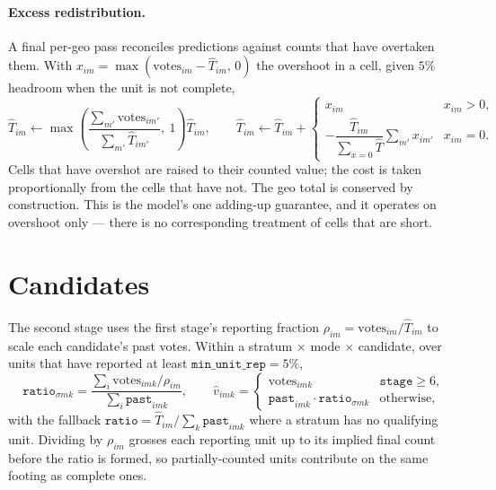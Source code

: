 \documentclass[11pt]{article}
\newcommand{\var}[1]{\texttt{#1}}
\begin{document}
\paragraph{Excess redistribution.} A final per-geo pass reconciles predictions against
counts that have overtaken them. With $x_{im} = \max(\text{votes}_{im} - \widehat{T}_{im},\,0)$
the overshoot in a cell, given $5\%$ headroom when the unit is not complete,
\begin{equation}
  \widehat{T}_{im} \leftarrow \max\!\left(\frac{\sum_{m'} \text{votes}_{im'}}{\sum_{m'} \widehat{T}_{im'}},\ 1\right) \widehat{T}_{im},
  \qquad
  \widehat{T}_{im} \leftarrow \widehat{T}_{im} +
  \begin{cases}
    x_{im} & x_{im} > 0,\\[3pt]
    -\dfrac{\widehat{T}_{im}}{\sum_{x=0} \widehat{T}} \displaystyle\sum_{m'} x_{im'} & x_{im} = 0 .
  \end{cases}
  \label{eq:excess}
\end{equation}
Cells that have overshot are raised to their counted value; the cost is taken
proportionally from the cells that have not. The geo total is conserved by construction.
This is the model's one adding-up guarantee, and it operates on overshoot only --- there
is no corresponding treatment of cells that are short.

\section{Candidates}

The second stage uses the first stage's reporting fraction
$\rho_{im} = \text{votes}_{im} / \widehat{T}_{im}$ to scale each candidate's past votes.
Within a stratum $\times$ mode $\times$ candidate, over units that have reported at least
$\var{min\_unit\_rep} = 5\%$,
\begin{equation}
  \var{ratio}_{\sigma m k} =
  \frac{\sum_{i} \text{votes}_{imk} / \rho_{im}}{\sum_{i} \var{past}_{imk}},
  \qquad
  \widehat{v}_{imk} =
  \begin{cases}
    \text{votes}_{imk} & \var{stage} \geq 6,\\
    \var{past}_{imk} \cdot \var{ratio}_{\sigma m k} & \text{otherwise,}
  \end{cases}
  \label{eq:cand}
\end{equation}
with the fallback $\var{ratio} = \widehat{T}_{im} / \sum_k \var{past}_{imk}$ where a
stratum has no qualifying unit. Dividing by $\rho_{im}$ grosses each reporting unit up to
its implied final count before the ratio is formed, so partially-counted units contribute
on the same footing as complete ones.
\end{document}
